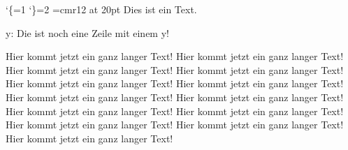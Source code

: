 %
%
%
\catcode`\{=1 %
\catcode`\}=2 %
%
%
\font\hugo=cmr12  at 20pt
\hugo
Dies ist ein Text.

y: Die ist noch eine Zeile mit einem y!

Hier kommt jetzt ein ganz langer Text!
Hier kommt jetzt ein ganz langer Text!
Hier kommt jetzt ein ganz langer Text!
Hier kommt jetzt ein ganz langer Text!
Hier kommt jetzt ein ganz langer Text!
Hier kommt jetzt ein ganz langer Text!
Hier kommt jetzt ein ganz langer Text!
Hier kommt jetzt ein ganz langer Text!
Hier kommt jetzt ein ganz langer Text!
Hier kommt jetzt ein ganz langer Text!
Hier kommt jetzt ein ganz langer Text!
Hier kommt jetzt ein ganz langer Text!
Hier kommt jetzt ein ganz langer Text!

